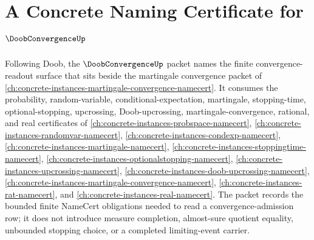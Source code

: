\chapter{A Concrete Naming Certificate for $\DoobConvergenceUp$}
\label{ch:concrete-instances-doob-convergence-namecert}

Following Doob, the $\DoobConvergenceUp$ packet names the finite convergence-readout surface that sits beside the martingale convergence packet of \autoref{ch:concrete-instances-martingale-convergence-namecert}. It consumes the probability, random-variable, conditional-expectation, martingale, stopping-time, optional-stopping, upcrossing, Doob-upcrossing, martingale-convergence, rational, and real certificates of \autoref{ch:concrete-instances-probspace-namecert}, \autoref{ch:concrete-instances-randomvar-namecert}, \autoref{ch:concrete-instances-condexp-namecert}, \autoref{ch:concrete-instances-martingale-namecert}, \autoref{ch:concrete-instances-stoppingtime-namecert}, \autoref{ch:concrete-instances-optionalstopping-namecert}, \autoref{ch:concrete-instances-upcrossing-namecert}, \autoref{ch:concrete-instances-doob-upcrossing-namecert}, \autoref{ch:concrete-instances-martingale-convergence-namecert}, \autoref{ch:concrete-instances-rat-namecert}, and \autoref{ch:concrete-instances-real-namecert}. The packet records the bounded finite NameCert obligations needed to read a convergence-admission row; it does not introduce measure completion, almost-sure quotient equality, unbounded stopping choice, or a completed limiting-event carrier.

